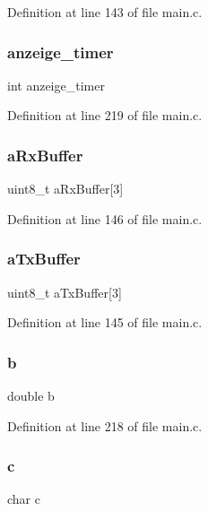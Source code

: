 Definition at line 143 of file main.\+c.

\mbox{\label{main_8c_a7a3b481511c41893f36210bca8c5020c}} 
\subsubsection{anzeige\+\_\+timer}
{\footnotesize\ttfamily int anzeige\+\_\+timer}



Definition at line 219 of file main.\+c.

\mbox{\label{main_8c_a2e21b8127e32a4233ee7daf77d42077a}} 
\subsubsection{a\+Rx\+Buffer}
{\footnotesize\ttfamily uint8\+\_\+t a\+Rx\+Buffer[3]}



Definition at line 146 of file main.\+c.

\mbox{\label{main_8c_aedcb29c32f7323e887731561839563d0}} 
\subsubsection{a\+Tx\+Buffer}
{\footnotesize\ttfamily uint8\+\_\+t a\+Tx\+Buffer[3]}



Definition at line 145 of file main.\+c.

\mbox{\label{main_8c_a1510a66dacf9cf3586de5fc89ae2a073}} 
\subsubsection{b}
{\footnotesize\ttfamily double b}



Definition at line 218 of file main.\+c.

\mbox{\label{main_8c_adc08ed1554f35803d229aeaf11216b3f}} 
\subsubsection{c}
{\footnotesize\ttfamily char c}



